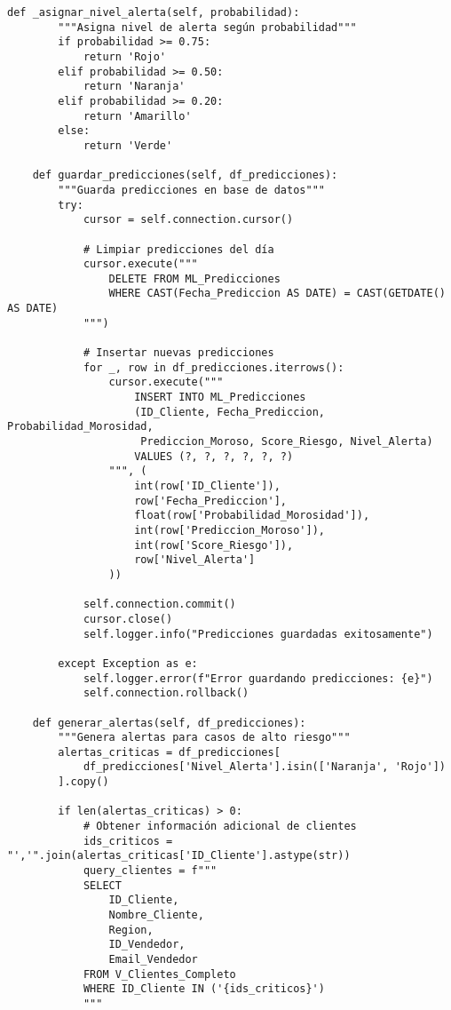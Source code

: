 \begin{verbatim}
def _asignar_nivel_alerta(self, probabilidad):
        """Asigna nivel de alerta según probabilidad"""
        if probabilidad >= 0.75:
            return 'Rojo'
        elif probabilidad >= 0.50:
            return 'Naranja'
        elif probabilidad >= 0.20:
            return 'Amarillo'
        else:
            return 'Verde'
    
    def guardar_predicciones(self, df_predicciones):
        """Guarda predicciones en base de datos"""
        try:
            cursor = self.connection.cursor()
            
            # Limpiar predicciones del día
            cursor.execute("""
                DELETE FROM ML_Predicciones 
                WHERE CAST(Fecha_Prediccion AS DATE) = CAST(GETDATE() AS DATE)
            """)
            
            # Insertar nuevas predicciones
            for _, row in df_predicciones.iterrows():
                cursor.execute("""
                    INSERT INTO ML_Predicciones 
                    (ID_Cliente, Fecha_Prediccion, Probabilidad_Morosidad, 
                     Prediccion_Moroso, Score_Riesgo, Nivel_Alerta)
                    VALUES (?, ?, ?, ?, ?, ?)
                """, (
                    int(row['ID_Cliente']),
                    row['Fecha_Prediccion'],
                    float(row['Probabilidad_Morosidad']),
                    int(row['Prediccion_Moroso']),
                    int(row['Score_Riesgo']),
                    row['Nivel_Alerta']
                ))
            
            self.connection.commit()
            cursor.close()
            self.logger.info("Predicciones guardadas exitosamente")
            
        except Exception as e:
            self.logger.error(f"Error guardando predicciones: {e}")
            self.connection.rollback()
    
    def generar_alertas(self, df_predicciones):
        """Genera alertas para casos de alto riesgo"""
        alertas_criticas = df_predicciones[
            df_predicciones['Nivel_Alerta'].isin(['Naranja', 'Rojo'])
        ].copy()
        
        if len(alertas_criticas) > 0:
            # Obtener información adicional de clientes
            ids_criticos = "','".join(alertas_criticas['ID_Cliente'].astype(str))
            query_clientes = f"""
            SELECT 
                ID_Cliente,
                Nombre_Cliente,
                Region,
                ID_Vendedor,
                Email_Vendedor
            FROM V_Clientes_Completo
            WHERE ID_Cliente IN ('{ids_criticos}')
            """
            

\end{verbatim}
